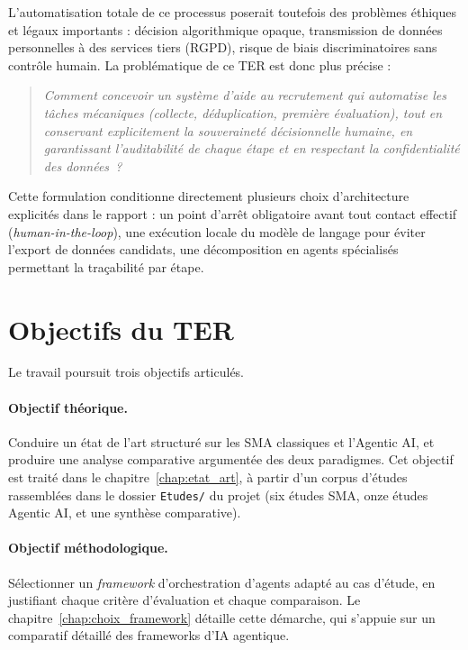 L'automatisation totale de ce processus poserait toutefois des problèmes éthiques et légaux importants : décision algorithmique opaque, transmission de données personnelles à des services tiers (RGPD), risque de biais discriminatoires sans contrôle humain. La problématique de ce TER est donc plus précise :

\begin{quote}
\itshape Comment concevoir un système d'aide au recrutement qui automatise les tâches mécaniques (collecte, déduplication, première évaluation), tout en conservant explicitement la souveraineté décisionnelle humaine, en garantissant l'auditabilité de chaque étape et en respectant la confidentialité des données~?
\end{quote}

Cette formulation conditionne directement plusieurs choix d'architecture explicités dans le rapport : un point d'arrêt obligatoire avant tout contact effectif (\emph{human-in-the-loop}), une exécution locale du modèle de langage pour éviter l'export de données candidats, une décomposition en agents spécialisés permettant la traçabilité par étape.

\section{Objectifs du TER}

Le travail poursuit trois objectifs articulés.

\paragraph{Objectif théorique.} Conduire un état de l'art structuré sur les SMA classiques et l'Agentic AI, et produire une analyse comparative argumentée des deux paradigmes. Cet objectif est traité dans le chapitre~\ref{chap:etat_art}, à partir d'un corpus d'études rassemblées dans le dossier \texttt{Etudes/} du projet (six études SMA, onze études Agentic AI, et une synthèse comparative).

\paragraph{Objectif méthodologique.} Sélectionner un \emph{framework} d'orchestration d'agents adapté au cas d'étude, en justifiant chaque critère d'évaluation et chaque comparaison. Le chapitre~\ref{chap:choix_framework} détaille cette démarche, qui s'appuie sur un comparatif détaillé des frameworks d'IA agentique.

